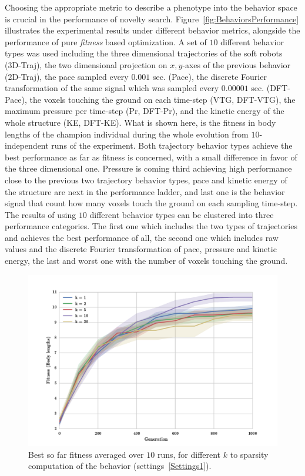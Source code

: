 Choosing the appropriate metric to describe a phenotype into the behavior space is crucial in the performance of novelty search. Figure~\ref{fig:BehaviorsPerformance} illustrates the experimental results under different behavior metrics, alongside the performance of pure \emph{fitness} based optimization. A set of $10$ different behavior types was used including the three dimensional trajectories of the soft robots (3D-Traj), the two dimensional projection on $x,y$-axes of the previous behavior (2D-Traj), the pace sampled every $0.001$ sec. (Pace), the discrete Fourier transformation of the same signal which was sampled every $0.00001$ sec. (DFT-Pace), the voxels touching the ground on each time-step (VTG, DFT-VTG), the maximum pressure per time-step (Pr, DFT-Pr), and the kinetic energy of the whole structure (KE, DFT-KE). What is shown here, is the fitness in body lengths of the champion individual during the whole evolution from $10$-independent runs of the experiment. Both trajectory behavior types achieve the best performance as far as fitness is concerned, with a small difference in favor of the three dimensional one. Pressure is coming third achieving high performance close to the previous two trajectory behavior types, pace and kinetic energy of the structure are next in the performance ladder, and last one is the behavior signal that count how many voxels touch the ground on each sampling time-step. The results of using $10$ different behavior types can be clustered into three performance categories. The first one which includes the two types of trajectories and achieves the best performance of all, the second one which includes raw values and the discrete Fourier transformation of pace, pressure and kinetic energy, the last and worst one with the number of voxels touching the ground. 

\begin{figure}[t!]
\centering
\includegraphics[width=1.0\textwidth]{../Figures/Results/KnnExperimentSize5.pdf}
\caption{Best so far fitness averaged over $10$ runs, for different $k$ to sparsity computation of the behavior (settings~\ref{Settings1}).}
\label{fig:KnnExperimentSize5}
\end{figure}

